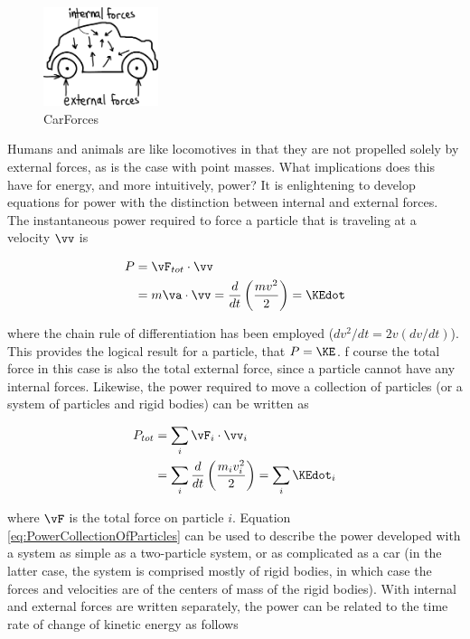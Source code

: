 \begin{figure}[h]		%
\begin{centering}
\includegraphics[width=0.3\textwidth]{Figures/CarForces}\par
\end{centering}
\caption{CarForces}
\label{fig:CarForces}
\end{figure}
%

Humans and animals are like locomotives in that they are not propelled solely by external forces, as is the case with point masses. What implications does this have for energy, and more intuitively, power? It is enlightening to develop equations for power with the distinction between internal and external forces. The instantaneous power required to force a particle that is traveling at a velocity $\vv$ is

\begin{align}
P &= \vF_{tot} \cdot \vv \\
 &= m\va \cdot \vv = \frac{d}{dt} \left(\frac{m v^2}{2}\right) = \KEdot
\end{align}

where the chain rule of differentiation has been employed ($dv^2/dt = 2v(dv/dt)$). This provides the logical result for a particle, that $P = \KE$. f course the total force in this case is also the total external force, since a particle cannot have any internal forces. Likewise, the power required to move a collection of particles (or a system of particles and rigid bodies) can be written as

\begin{align}
P_{tot} &= \sum_i \vF_i \cdot \vv_i \\
&= \sum_i \frac{d}{dt}\left(\frac{m_i v_i^2}{2}\right) = \sum_i \KEdot_i 
\label{eq:PowerCollectionOfParticles}
\end{align}

where $\vF$ is the total force on particle $i$. Equation \ref{eq:PowerCollectionOfParticles} can be used to describe the power developed with a system as simple as a two-particle system, or as complicated as a car (in the latter case, the system is comprised mostly of rigid bodies, in which case the forces and velocities are of the centers of mass of the rigid bodies). With internal and external forces are written separately, the power can be related to the time rate of change of kinetic energy as follows

